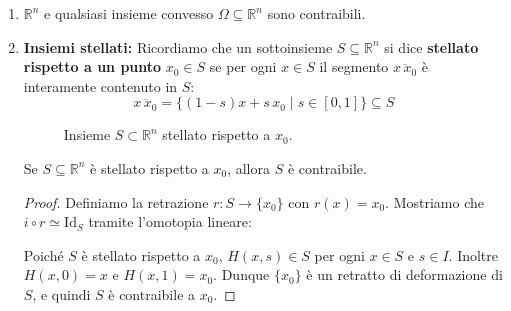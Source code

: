 \begin{ejemplo}
\begin{enumerate}
    \item $\mathbb{R}^n$ e qualsiasi insieme convesso $\Omega \subseteq \mathbb{R}^n$ sono contraibili.
    
    \item \textbf{Insiemi stellati:} Ricordiamo che un sottoinsieme $S \subseteq \mathbb{R}^n$ si dice \textbf{stellato rispetto a un punto} $x_0 \in S$ se per ogni $x \in S$ il segmento $\overline{x\, x_0}$ è interamente contenuto in $S$:
    \[
    \overline{x\, x_0} = \{(1-s)x + s\,x_0 \mid s \in [0,1]\} \subseteq S
    \]

    \begin{figure}[H]
        \centering
        \caption{Insieme $S \subset \mathbb{R}^n$ stellato rispetto a $x_0$.}
    \end{figure}

    \begin{prop}
    Se $S \subseteq \mathbb{R}^n$ è stellato rispetto a $x_0$, allora $S$ è contraibile.
    \end{prop}

    \begin{proof}
    Definiamo la retrazione $r: S \to \{x_0\}$ con $r(x) = x_0$.
    Mostriamo che $i \circ r \simeq \mathrm{Id}_S$ tramite l'omotopia lineare:
    
    Poiché $S$ è stellato rispetto a $x_0$, $H(x,s) \in S$ per ogni $x \in S$ e $s \in I$. Inoltre $H(x,0) = x$ e $H(x,1) = x_0$. Dunque $\{x_0\}$ è un retratto di deformazione di $S$, e quindi $S$ è contraibile a $x_0$.
    \end{proof}
\end{enumerate}
\end{ejemplo}

